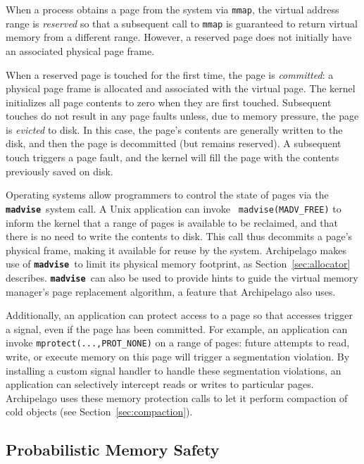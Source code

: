 \documentclass{acm_proc_article-sp}
\newcommand{\cfunction}[1]{{\bf \tt #1}}
\newcommand{\madvise}{\cfunction{madvise}}
\begin{document}
When a process obtains a page from the system via {\tt mmap}, the
virtual address range is \emph{reserved} so that a subsequent call to
{\tt mmap} is guaranteed to return virtual memory from a different
range. However, a reserved page does not initially have an associated
physical page frame.

When a reserved page is touched for the first time, the page is
\emph{committed}: a physical page frame is allocated and associated with the
virtual page. The kernel initializes all page contents to zero when
they are first touched. Subsequent touches do not result in any page
faults unless, due to memory pressure, the page is
\emph{evicted} to disk. In this case, the page's contents are
generally written to the disk, and then the page is decommitted (but
remains reserved). A subsequent touch triggers a page fault, and the
kernel will fill the page with the contents previously saved on disk.

Operating systems allow programmers to control the state of pages via
the \madvise\ system call. A Unix application can invoke {\tt
madvise(MADV\_FREE)} to inform the kernel that a range of pages is
available to be reclaimed, and that there is no need to write the
contents to disk. This call thus decommits a page's physical frame,
making it available for reuse by the system. Archipelago makes use of
\madvise\ to limit its physical memory footprint, as Section~\ref{sec:allocator} describes. \madvise\ can also be used to provide hints to guide the virtual memory manager's page replacement algorithm, a feature that Archipelago also uses.

Additionally, an application can protect access to a page so that
accesses trigger a signal, even if the page has been committed. For
example, an application can invoke {\tt mprotect(...,PROT\_NONE)} on a
range of pages: future attempts to read, write, or execute memory on
this page will trigger a segmentation violation. By installing a
custom signal handler to handle these segmentation violations, an
application can selectively intercept reads or writes to particular
pages. Archipelago uses these memory protection calls to let it
perform compaction of cold objects (see Section~\ref{sec:compaction}).



\subsection{Probabilistic Memory Safety}
\label{sec:prob}
\end{document}
